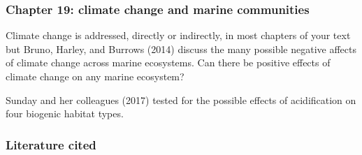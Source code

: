 \documentclass[12pt, addpoints]{exam}
\begin{document}
\begin{questions}
\begin{parts}
\end{parts}

\subsubsection*{Chapter 19: climate change and marine communities}

Climate change is addressed, directly or indirectly, in most chapters of your text but Bruno, Harley, and Burrows (2014) discuss the many possible negative affects of climate change across marine ecosystems. Can there be positive effects of climate change on any marine ecosystem?

\question
Sunday and her colleagues (2017) tested for the possible effects of acidification on four biogenic habitat types. 

\end{questions}

\subsubsection*{Literature cited}
\end{document}
